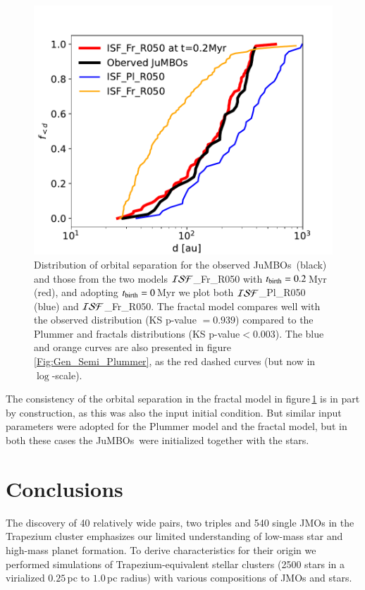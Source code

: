 \documentclass[submission,phys]{lib/SciPost}
\newcommand{\jumbos}{\mbox{JuMBOs}}
\begin{document}
\begin{figure}
    \centering
    \includegraphics[width=0.75\columnwidth]{figures/fig_orbital_separation_ISF.pdf}
    \caption{Distribution of orbital separation for the observed
      \jumbos\, (black) and those from the two models ${\cal
        ISF}$\_Fr\_R050 with $t_{\rm birth} = 0.2$\,Myr (red), and
      adopting $t_{\rm birth} = 0$\,Myr we plot both ${\cal
        ISF}$\_Pl\_R050 (blue) and ${\cal ISF}$\_Fr\_R050. The fractal
      model compares well with the observed distribution (KS p-value
      $= 0.939$) compared to the Plummer and fractals distributions
      (KS p-value$<0.003$). The blue and orange curves are also
      presented in figure\,\ref{Fig:Gen_Semi_Plummer}, as the red
      dashed curves (but now in $\log$-scale).}
    \label{Fig:orbital_separation_ISF_late_foramtion}
\end{figure}

The consistency of the orbital separation in the fractal model in
figure\,\ref{Fig:orbital_separation_ISF_late_foramtion} is in part by
construction, as this was also the input initial condition.  But
similar input parameters were adopted for the Plummer model and the
fractal model, but in both these cases the \jumbos\, were initialized
together with the stars.


\section{Conclusions}\label{Sect:Conclusions}

   
The discovery of 40 relatively wide pairs, two triples and 540 single
JMOs in the Trapezium cluster emphasizes our limited understanding of
low-mass star and high-mass planet formation. To derive
characteristics for their origin we performed simulations of
Trapezium-equivalent stellar clusters (2500 stars in a virialized
$0.25$\,pc to $1.0$\,pc radius) with various compositions of JMOs and
stars.
\end{document}
